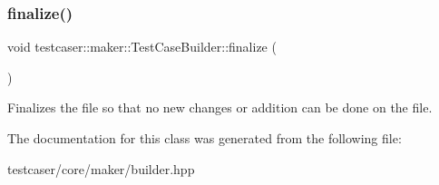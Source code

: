 \subsubsection{\texorpdfstring{finalize()}{finalize()}}
{\footnotesize\ttfamily void testcaser\+::maker\+::\+Test\+Case\+Builder\+::finalize (\begin{DoxyParamCaption}{ }\end{DoxyParamCaption})\hspace{0.3cm}{\ttfamily [inline]}}



Finalizes the file so that no new changes or addition can be done on the file. 



The documentation for this class was generated from the following file\+:\begin{DoxyCompactItemize}
\item 
testcaser/core/maker/builder.\+hpp\end{DoxyCompactItemize}
